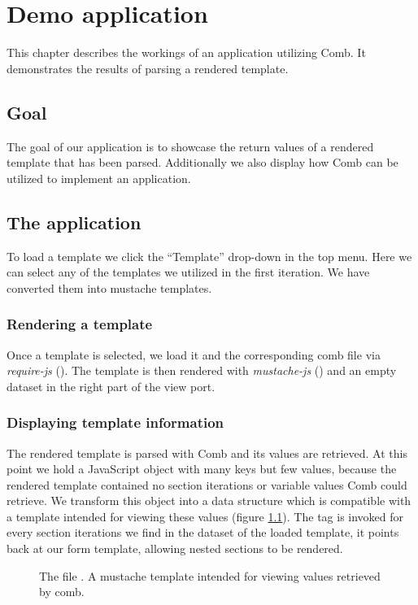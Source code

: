 \documentclass[thesis.tex]{subfiles}
\begin{document}
\chapter{Demo application}
\label{chap:demo}
This chapter describes the workings of an application utilizing Comb.
It demonstrates the results of parsing a rendered template.

\section{Goal}
The goal of our application is to showcase the return values of a
rendered template that has been parsed.
Additionally we also display how Comb can be utilized to implement an
application.

\section{The application}
To load a template we click the ``Template'' drop-down in the top menu.
Here we can select any of the templates we utilized in the first iteration.
We have converted them into mustache templates.

\subsection{Rendering a template}
Once a template is selected, we load it and the corresponding comb file via
\emph{require-js} (). The template is then rendered with
\emph{mustache-js} () and an empty dataset in the right part of the view port.

\subsection{Displaying template information}
The rendered template is parsed with Comb and its values are retrieved.
At this point we hold a JavaScript object with many keys but few values,
because the rendered template contained no section iterations or variable values
Comb could retrieve. We transform this object into a data structure which is
compatible with a template intended for viewing these values
(figure \ref{fig:mustache.mustache}).
The  tag is invoked for every section iterations we
find in the dataset of the loaded template, it points back at our form template,
allowing nested sections to be rendered.

\begin{figure}
	\centering
	
	\caption{The file . A mustache template intended for viewing values retrieved by comb.}
	\label{fig:mustache.mustache}
\end{figure}
\end{document}
